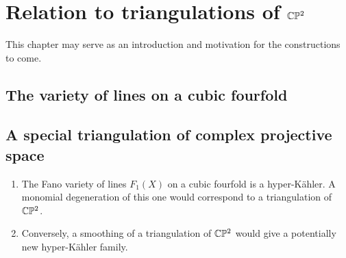 \chapter{Relation to triangulations of \texorpdfstring{$\mathbb{C}\mathbb{P}^2$}{CP2}}
\label{sec:cp2triangs}

This chapter may serve as an introduction and motivation for the constructions to come. 

\section{The variety of lines on a cubic fourfold}

\section{A special triangulation of complex projective space}



\begin{enumerate}
	\item The Fano variety of lines $F_1(X)$ on a cubic fourfold is a hyper-Kähler. A monomial degeneration of this one would correspond to a triangulation of $\mathbb{C} \mathbb{P} ^2$.
	\item Conversely, a smoothing of a triangulation of $\mathbb{C} \mathbb{P}^2$ would give a potentially new hyper-Kähler family.
\end{enumerate}